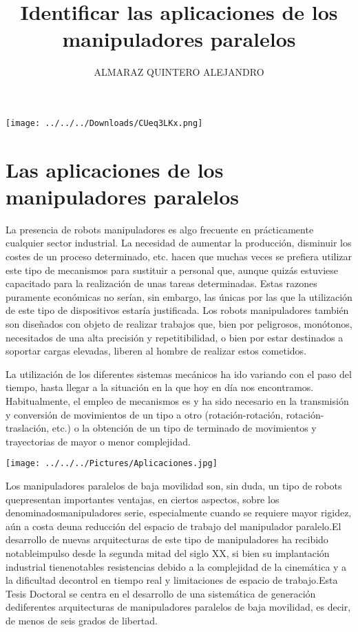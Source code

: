 \documentclass[12pt,a4paper]{article}
\author{ALMARAZ QUINTERO ALEJANDRO}
\title{Identificar las aplicaciones de los manipuladores paralelos}
\begin{document}
\maketitle

\texttt{[image: ../../../Downloads/CUeq3LKx.png]} 
\clearpage

\section{Las aplicaciones de los manipuladores paralelos}
La presencia de robots manipuladores es algo frecuente en prácticamente
cualquier sector industrial. La necesidad de aumentar la producción, disminuir
los costes de un proceso determinado, etc. hacen que muchas veces se prefiera
utilizar este tipo de mecanismos para sustituir a personal que, aunque quizás
estuviese capacitado para la realización de unas tareas determinadas.
Estas razones puramente económicas no serían, sin embargo, las únicas por
las que la utilización de este tipo de dispositivos estaría justificada. Los robots
manipuladores también son diseñados con objeto de realizar trabajos que, bien
por peligrosos, monótonos, necesitados de una alta precisión y repetitibilidad,
o bien por estar destinados a soportar cargas elevadas, liberen al hombre de
realizar estos cometidos.

La utilización de los diferentes sistemas mecánicos ha ido variando con el
paso del tiempo, hasta llegar a la situación en la que hoy en día nos encontramos. Habitualmente, el empleo de mecanismos es y ha sido necesario en la
transmisión y conversión de movimientos de un tipo a otro (rotación-rotación,
rotación-traslación, etc.) o la obtención de un tipo de terminado de movimientos y trayectorias de mayor o menor complejidad.


\texttt{[image: ../../../Pictures/Aplicaciones.jpg]} 

Los manipuladores paralelos de baja movilidad son, sin duda, un tipo de robots quepresentan importantes ventajas, en ciertos aspectos, sobre los denominadosmanipuladores serie, especialmente cuando se requiere mayor rigidez, aún a costa deuna reducción del espacio de trabajo del manipulador paralelo.El desarrollo de nuevas arquitecturas de este tipo de manipuladores ha recibido notableimpulso desde la segunda mitad del siglo XX, si bien su implantación industrial tienenotables resistencias debido a la complejidad de la cinemática y a la dificultad decontrol en tiempo real y limitaciones de espacio de trabajo.Esta Tesis Doctoral se centra en el desarrollo de una sistemática de generación dediferentes arquitecturas de manipuladores paralelos de baja movilidad, es decir, de menos de seis grados de libertad.
\end{document}
